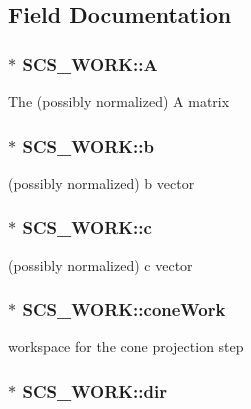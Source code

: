 \subsection{Field Documentation}
\hypertarget{struct_s_c_s___w_o_r_k_afe6650f1ce2c18865f73314ed5b49261}{
\subsubsection[{A}]{$\ast$ S\-C\-S\-\_\-\-W\-O\-R\-K\-::\-A}}\label{struct_s_c_s___w_o_r_k_afe6650f1ce2c18865f73314ed5b49261}
The (possibly normalized) {\ttfamily A} matrix \hypertarget{struct_s_c_s___w_o_r_k_af34066f7314e529b105b1a88776eb2c7}{
\subsubsection[{b}]{$\ast$ S\-C\-S\-\_\-\-W\-O\-R\-K\-::b}}\label{struct_s_c_s___w_o_r_k_af34066f7314e529b105b1a88776eb2c7}
(possibly normalized) {\ttfamily b} vector \hypertarget{struct_s_c_s___w_o_r_k_a28739f0f5ed9b1f2184133571a5963a1}{
\subsubsection[{c}]{$\ast$ S\-C\-S\-\_\-\-W\-O\-R\-K\-::c}}\label{struct_s_c_s___w_o_r_k_a28739f0f5ed9b1f2184133571a5963a1}
(possibly normalized) {\ttfamily c} vector \hypertarget{struct_s_c_s___w_o_r_k_a6286cc9b1462d1f0adf9046b03ca6277}{
\subsubsection[{cone\-Work}]{$\ast$ S\-C\-S\-\_\-\-W\-O\-R\-K\-::cone\-Work}}\label{struct_s_c_s___w_o_r_k_a6286cc9b1462d1f0adf9046b03ca6277}
workspace for the cone projection step \hypertarget{struct_s_c_s___w_o_r_k_a2f5ec63f05a0d782eed2435d24e018b0}{
\subsubsection[{dir}]{$\ast$ S\-C\-S\-\_\-\-W\-O\-R\-K\-::dir}}\label{struct_s_c_s___w_o_r_k_a2f5ec63f05a0d782eed2435d24e018b0}
